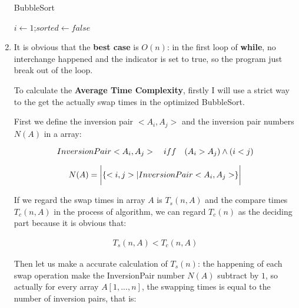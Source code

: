 \documentclass[12pt,a4paper]{article}
\makeatletter
\newtheorem*{solution}{Solution}
\theoremstyle{definition}
\renewenvironment{solution}[1][Solution] {\par\pushQED{\qed}\normalfont\topsep6\p@\@plus6\p@\relax\trivlist\item[\hskip\labelsep\bfseries#1\@addpunct{.}]\ignorespaces}{\popQED\endtrivlist\@endpefalse} \makeatother
\makeatother
\begin{document}
\begin{enumerate}
\begin{minipage}[t]{0.8\textwidth}
\begin{algorithm}[H]
        \BlankLine
        \caption{BubbleSort}\label{Alg_Bubble}

        $i\leftarrow 1$;$sorted\leftarrow false$\;

    \end{algorithm}
    \end{minipage}

    \begin{solution}
   
     It is obvious that the \textbf{best case} is $O(n)$: in the first loop of \textbf{while}, no interchange happened and the indicator is set to
       true, so the program just break out of the loop.

    To calculate the \textbf{Average Time Complexity}, firstly I will use a strict way to the get the actually swap times in the optimized BubbleSort.

    First we define the inversion pair $<A_i, A_j>$ and the inversion pair numbers $N(A)$ in a array:

    \begin{equation*}
        InversionPair<A_i, A_j> \quad iff \quad (A_i > A_j) \land (i < j) \\
    \end{equation*}

    \begin{equation*}
        N(A) = \bigg{|}\{<i, j> | InversionPair<A_i, A_j>\}\bigg{|}
    \end{equation*}

    If we regard the swap times in array $A$ is $T_s(n, A)$ and the compare times $T_c(n, A)$ in the process of algorithm, we can regard $T_c(n)$ as the deciding part because it is obvious that:

    \begin{align*}
        T_s(n, A) < T_c(n, A)
    \end{align*}

    Then let us make a accurate calculation of $T_s(n)$: the happening of each swap operation make the InversionPair number $N(A)$ subtract by $1$, so actually for 
    every array $A[1, ..., n]$, the swapping times is equal to the number of inversion pairs, that is:
   

\end{solution}
\end{enumerate}
\end{document}
